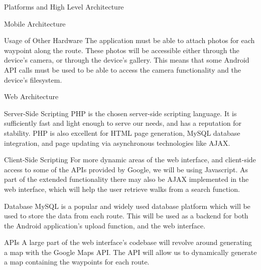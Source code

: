 \documentclass{article}
\begin{document}
\begin{section}{Platforms and High Level Architecture}
\begin{subsection}{Mobile Architecture}
			\begin{subsubsection}{Usage of Other Hardware}
				The application must be able to attach photos for each waypoint along the route. These photos will be accessible either through the device's camera, or through the device's gallery. This means that some Android API calls must be used to be able to access the camera functionality and the device's filesystem.
			\end{subsubsection}
		\end{subsection}
		
		\begin{subsection}{Web Architecture}
			\begin{subsubsection}{Server-Side Scripting}
				PHP is the chosen server-side scripting language. It is sufficiently fast and light enough to serve our needs, and has a reputation for stability. PHP is also excellent for HTML page generation, MySQL database integration, and page updating via asynchronous technologies like AJAX.
			\end{subsubsection}
			
			\begin{subsubsection}{Client-Side Scripting}
				For more dynamic areas of the web interface, and client-side access to some of the APIs provided by Google, we will be using Javascript. As part of the extended functionality there may also be AJAX implemented in the web interface, which will help the user retrieve walks from a search function.
			\end{subsubsection}
			
			\begin{subsubsection}{Database}
				MySQL is a popular and widely used database platform which will be used to store the data from each route. This will be used as a backend for both the Android application's upload function, and the web interface.
			\end{subsubsection}			
			
			\begin{subsubsection}{APIs}
				A large part of the web interface's codebase will revolve around generating a map with the Google Maps API. The API will allow us to dynamically generate a map containing the waypoints for each route.
			\end{subsubsection}
		\end{subsection}
	\end{section}
	
\end{document}
